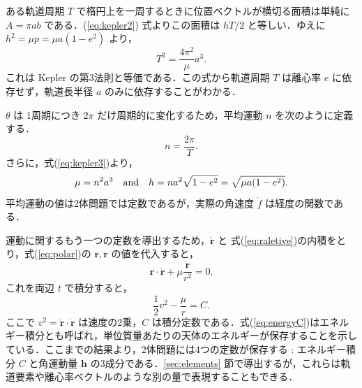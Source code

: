 \documentclass[11pt,a4paper,oneside,onecolumn]{jreport}
\begin{document}
ある軌道周期 $T$ で楕円上を一周するときに位置ベクトルが横切る面積は単純に $A = \pi a b$ である．(\ref{eq:kepler2}) 式よりこの面積は $h T / 2$ と等しい．ゆえに $h^2 = \mu p = \mu a (1 - e^2)$ より，
\begin{equation}
T^2 = \frac{4 \pi^2}{\mu} a^3. \label{eq:kepler3}
\end{equation}
これは Kepler の第3法則と等価である．この式から軌道周期 $T$ は離心率 $e$ に依存せず，軌道長半径 $a$ のみに依存することがわかる．

$\theta$ は 1周期につき $2 \pi$ だけ周期的に変化するため，平均運動 $n$ を次のように定義する．
\begin{equation}
n = \frac{2 \pi}{T}. \label{eq:n}
\end{equation}
さらに，式(\ref{eq:kepler3})より，
\begin{equation}
\mu = n^2 a^3 \quad {\rm and} \quad h = n a^2 \sqrt{1 - e^2} = \sqrt{\mu a (1 - e^2)}. \label{eq:mu}
\end{equation}
平均運動の値は2体問題では定数であるが，実際の角速度 $\dot{f}$ は経度の関数である．

運動に関するもう一つの定数を導出するため，$\dot{{\bm r}}$ と 式(\ref{eq:raletive})の内積をとり，式(\ref{eq:polar})の ${\bm r}, \ddot{{\bm r}}$ の値を代入すると，
\begin{equation}
{\bm r} \cdot \ddot{{\bm r}} + \mu \frac{\dot{{\bm r}}}{r^2} = 0.
\end{equation}
これを両辺 $t$ で積分すると，
\begin{equation}
\frac{1}{2} v^2 - \frac{\mu}{r} = C. \label{eq:energyC}
\end{equation}
ここで $v^2 = \dot{{\bm r}} \cdot \dot{{\bm r}}$ は速度の2乗，$C$ は積分定数である．式(\ref{eq:energyC})はエネルギー積分とも呼ばれ，単位質量あたりの天体のエネルギーが保存することを示している．ここまでの結果より，2体問題には4つの定数が保存する : エネルギー積分 $C$ と角運動量 ${\bm h}$ の3成分である．\ref{sec:elements} 節で導出するが，これらは軌道要素や離心率ベクトルのような別の量で表現することもできる．
\end{document}

